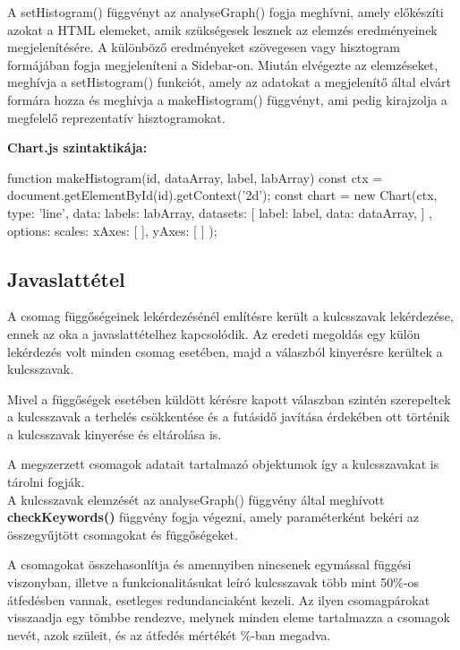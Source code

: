 A setHistogram() függvényt az analyseGraph() fogja meghívni, amely előkészíti azokat a HTML elemeket, amik szükségesek lesznek az elemzés eredményeinek megjelenítésére. A különböző eredményeket szövegesen vagy hisztogram formájában fogja megjeleníteni a Sidebar-on. Miután elvégezte az elemzéseket, meghívja a setHistogram() funkciót, amely az adatokat a megjelenítő által elvárt formára hozza és meghívja a makeHistogram() függvényt, ami pedig kirajzolja a megfelelő reprezentatív hisztogramokat. 

\pagebreak
 
\noindent\textbf{Chart.js szintaktikája:}
 
\begin{js}
function makeHistogram(id, dataArray, label, labArray){
	const ctx = document.getElementById(id).getContext('2d');
	const chart = new Chart(ctx, {
		type: 'line',
		data: {
			labels: labArray,
			datasets: [{
				label: label,
				data: dataArray,
			}]
		},
		options: {
			scales: {
				xAxes: [{
				}],
				yAxes: [{
				}]
			}
		}
	});
}	
\end{js}

\subsection{Javaslattétel}

A csomag függőségeinek lekérdezésénél említésre került a kulcsszavak lekérdezése, ennek az oka a javaslattételhez kapcsolódik. Az eredeti megoldás egy külön lekérdezés volt minden csomag esetében, majd a válaszból kinyerésre kerültek a kulcsszavak. 

Mivel a függőségek esetében küldött kérésre kapott válaszban szintén szerepeltek a kulcsszavak a terhelés csökkentése és a futásidő javítása érdekében ott történik a kulcsszavak kinyerése és eltárolása is.

A megszerzett csomagok adatait tartalmazó objektumok így a kulcsszavakat is tárolni fogják.\\

A kulcsszavak elemzését az analyseGraph() függvény által meghívott \textbf{checkKeywords()} függvény fogja végezni, amely paraméterként bekéri az összegyűjtött csomagokat és függőségeket.

A csomagokat összehasonlítja és amennyiben nincsenek egymással függési viszonyban, illetve a funkcionalitásukat leíró kulcsszavak több mint 50\%-os átfedésben vannak, esetleges redundanciaként kezeli.
Az ilyen csomagpárokat visszaadja egy tömbbe rendezve, melynek minden eleme tartalmazza a csomagok nevét, azok szüleit, és az átfedés mértékét \%-ban megadva.


